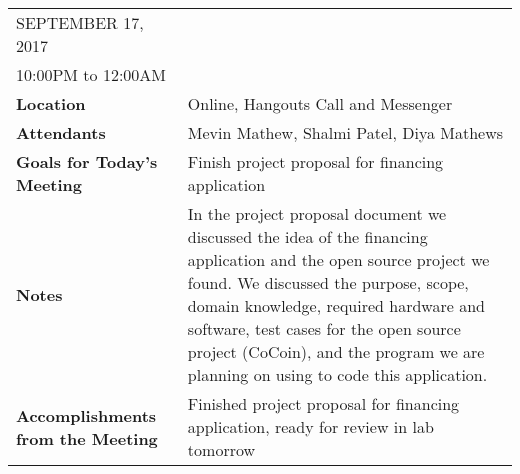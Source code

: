 \documentclass{article}
\begin{document}
\begin{table}[hp]
\begin{tabularx}{\textwidth}{lX}
\toprule
SEPTEMBER 17, 2017\\
10:00PM to 12:00AM\\
\midrule
\textbf{Location} & Online, Hangouts Call and Messenger\\
\textbf{Attendants} & Mevin Mathew, Shalmi Patel, Diya Mathews\\
\midrule
\textbf{Goals for Today's Meeting} & Finish project proposal for financing application\\
\midrule
\textbf{Notes} & In the project proposal document we discussed the idea of the financing application and the open source project we found. We discussed the purpose, scope, domain knowledge, required hardware and software, test cases for the open source project (CoCoin), and the program we are planning on using to code this application.\\
\midrule
\textbf{Accomplishments from the Meeting} & Finished project proposal for financing application, ready for review in lab tomorrow\\
\bottomrule
\end{tabularx}
\end{table}
\end{document}
